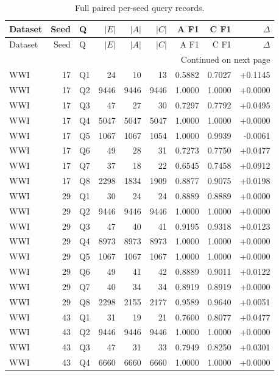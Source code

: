 \documentclass[11pt,letterpaper]{article}
\begin{document}
\small\begin{longtable}{lrlrrrrrr}
\caption{Full paired per-seed query records.}\\
\toprule Dataset & Seed & Q & $|E|$ & $|A|$ & $|C|$ & A F1 & C F1 & $\Delta$\\\midrule\endfirsthead
\toprule Dataset & Seed & Q & $|E|$ & $|A|$ & $|C|$ & A F1 & C F1 & $\Delta$\\\midrule\endhead
\midrule\multicolumn{9}{r}{Continued on next page}\\\endfoot
\bottomrule\endlastfoot
WWI & 17 & Q1 & 24 & 10 & 13 & 0.5882 & 0.7027 & +0.1145\\
WWI & 17 & Q2 & 9446 & 9446 & 9446 & 1.0000 & 1.0000 & +0.0000\\
WWI & 17 & Q3 & 47 & 27 & 30 & 0.7297 & 0.7792 & +0.0495\\
WWI & 17 & Q4 & 5047 & 5047 & 5047 & 1.0000 & 1.0000 & +0.0000\\
WWI & 17 & Q5 & 1067 & 1067 & 1054 & 1.0000 & 0.9939 & -0.0061\\
WWI & 17 & Q6 & 49 & 28 & 31 & 0.7273 & 0.7750 & +0.0477\\
WWI & 17 & Q7 & 37 & 18 & 22 & 0.6545 & 0.7458 & +0.0912\\
WWI & 17 & Q8 & 2298 & 1834 & 1909 & 0.8877 & 0.9075 & +0.0198\\
WWI & 29 & Q1 & 30 & 24 & 24 & 0.8889 & 0.8889 & +0.0000\\
WWI & 29 & Q2 & 9446 & 9446 & 9446 & 1.0000 & 1.0000 & +0.0000\\
WWI & 29 & Q3 & 47 & 40 & 41 & 0.9195 & 0.9318 & +0.0123\\
WWI & 29 & Q4 & 8973 & 8973 & 8973 & 1.0000 & 1.0000 & +0.0000\\
WWI & 29 & Q5 & 1067 & 1067 & 1067 & 1.0000 & 1.0000 & +0.0000\\
WWI & 29 & Q6 & 49 & 41 & 42 & 0.8889 & 0.9011 & +0.0122\\
WWI & 29 & Q7 & 40 & 34 & 34 & 0.8919 & 0.8919 & +0.0000\\
WWI & 29 & Q8 & 2298 & 2155 & 2177 & 0.9589 & 0.9640 & +0.0051\\
WWI & 43 & Q1 & 31 & 19 & 21 & 0.7600 & 0.8077 & +0.0477\\
WWI & 43 & Q2 & 9446 & 9446 & 9446 & 1.0000 & 1.0000 & +0.0000\\
WWI & 43 & Q3 & 47 & 31 & 33 & 0.7949 & 0.8250 & +0.0301\\
WWI & 43 & Q4 & 6660 & 6660 & 6660 & 1.0000 & 1.0000 & +0.0000\\

\end{longtable}
\end{document}
